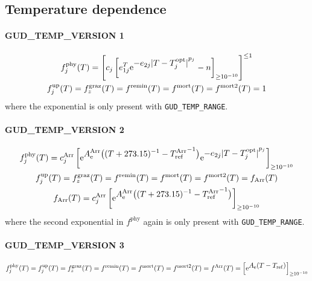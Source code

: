 \documentclass[11pt,letterpaper,english]{article}
\let\ds=\displaystyle
\def\|#1|{\operatorname{#1}}
\newcommand{\ee}{\mathrm{e}}
\newcommand{\graz}{{\text{graz}}}
\newcommand{\phy}{{\text{phy}}}
\newcommand{\up}{{\text{up}}}
\newcommand{\remin}{{\text{remin}}}
\begin{document}
{\subsection{Temperature dependence}

\paragraph{GUD\_TEMP\_VERSION 1}
\begin{gather*}
  f^\phy_j(T) = \left[ c_j \left[ e_{1 j}^T
      \ee^{\ds -e_{2 j} {| T - T^{\|opt|}_j |}^{p_j}}  %
    - n \right]_{\ge\num{E-10}}
    \right]^{\le 1}
\\
  f^{\up}_j(T) =
  f^\graz_z(T) =
  f^\remin(T) =
  f^{\|mort|}(T) =
  f^{\|mort2|}(T) =
  1
\end{gather*}
where the exponential is only present with \verb|GUD_TEMP_RANGE|.

\paragraph{GUD\_TEMP\_VERSION 2}
\begin{gather*}
  f^\phy_j(T) = c^{\|Arr|}_j \left[
      \ee^{\ds A^{\|Arr|}_{\|e|}
           \bigl( (T+273.15)^{-1} - {T^{\|Arr|}_{\|ref|}}^{-1} \bigr)}
      \ee^{\ds -e_{2 j} {| T - T^{\|opt|}_j |}^{p_j}}  %
    \right]_{\ge\num{E-10}}
\\
  f^{\up}_j(T) =
  f^\graz_z(T) =
  f^\remin(T) =
  f^{\|mort|}(T) =
  f^{\|mort2|}(T) =
  f_{\|Arr|}(T)
\\
  f_{\|Arr|}(T) = c^{\|Arr|}_j \left[
      \ee^{\ds A^{\|Arr|}_{\|e|}
           \bigl( (T+273.15)^{-1} - {T^{\|Arr|}_{\|ref|}}^{-1} \bigr)}
    \right]_{\ge\num{E-10}}
\end{gather*}
where the second exponential in $f^\phy$ again is only present with \verb|GUD_TEMP_RANGE|.

\paragraph{GUD\_TEMP\_VERSION 3}
\begin{gather*}
  f^\phy_j(T) =
  f^{\up}_j(T) =
  f^\graz_z(T) =
  f^\remin(T) =
  f^{\|mort|}(T) =
  f^{\|mort2|}(T) =
  f^{\|Arr|}(T) =
  \left[ \ee^{\ds A_{\|e|} (T - T_{\|ref|})} \right]_{\ge\num{E-10}}
\end{gather*}

}
\end{document}
